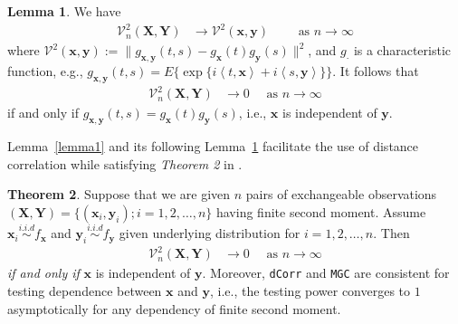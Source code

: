 \documentclass[12pt]{article}
\theoremstyle{definition}
\newtheorem{theorem}{Theorem}[section]
\newtheorem{lemma}[theorem]{Lemma}
\begin{document}
\begin{lemma}
	\label{lemma2}
We have 
	\begin{eqnarray}
		\mathcal{V}_{n}^{2}(\mathbf{X},\mathbf{Y}) &\longrightarrow \mathcal{V}^{2}(\mathbf{x},\mathbf{y}) \quad \quad \mbox{ as } n \rightarrow \infty
	\label{eq:conv1}
	\end{eqnarray}
where $\mathcal{V}^{2} (\mathbf{x},\mathbf{y}) := \| g_{\mathbf{x},\mathbf{y}}(t,s) - g_{\mathbf{x}}(t) g_{\mathbf{y}}(s) \|^2$, and $g_{\cdot}$ is a characteristic function, e.g., $g_{\mathbf{x},\mathbf{y}}(t,s) = E\{\exp\{i \left\langle t,\mathbf{x} \right\rangle  +i \left\langle  s,\mathbf{y}\right\rangle \}\}$.
	It follows that 
	\begin{eqnarray}
		\mathcal{V}_{n}^{2}(\mathbf{X},\mathbf{Y}) &\rightarrow 0 \quad \mbox{ as } n \rightarrow \infty
		\label{eq:conv2}
	\end{eqnarray}
	if and only if $g_{\mathbf{x},\mathbf{y}}(t,s) = g_{\mathbf{x}}(t) g_{\mathbf{y}}(s)$, i.e., $\mathbf{x}$ is independent of $\mathbf{y}$.
\end{lemma}
Lemma~\ref{lemma1} and its following Lemma~\ref{lemma2} facilitate the use of distance correlation while satisfying \textit{Theorem 2} in \cite{szekely2007measuring}.  

\begin{theorem}
	Suppose that we are given $n$ pairs of exchangeable observations $(\mathbf{X}, \mathbf{Y}) = \{  (\mathbf{x}_{i}, \mathbf{y}_{i} ) ; i = 1,2, \ldots, n \}$ having finite second moment. Assume $\mathbf{x}_{i} \overset{i.i.d}{\sim} f_{\mathbf{x}}$ and $\mathbf{y}_{i} \overset{i.i.d}{\sim} f_{\mathbf{y}}$ given underlying distribution for $i = 1,2, \ldots, n$. Then
	\begin{eqnarray}
		\mathcal{V}_{n}^{2}(\mathbf{X},\mathbf{Y}) &\longrightarrow 0 \quad \mbox{ as } n \rightarrow \infty
	\end{eqnarray}	
	\textit{if and only if} $\mathbf{x}$ is independent of $\mathbf{y}$. Moreover, \texttt{dCorr} and \texttt{MGC} are consistent for testing dependence between $\mathbf{x}$ and $\mathbf{y}$, i.e., the testing power converges to $1$ asymptotically for any dependency of finite second moment.
	\label{theoremMain}
\end{theorem}
\end{document}
